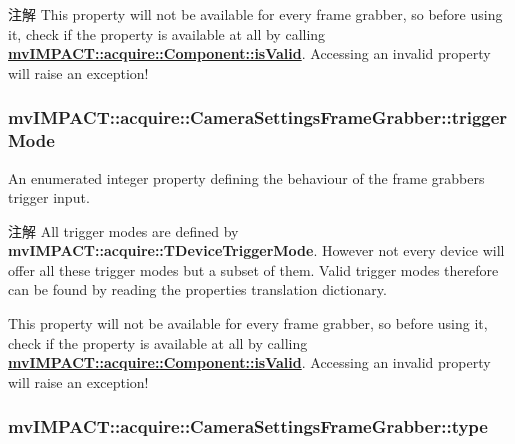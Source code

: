 \begin{DoxyNote}{注解}
This property will not be available for every frame grabber, so before using it, check if the property is available at all by calling {\bfseries \hyperlink{classmv_i_m_p_a_c_t_1_1acquire_1_1_component_ac51e55e7e046101f3c6119d84123abd5}{mv\+I\+M\+P\+A\+C\+T\+::acquire\+::\+Component\+::is\+Valid}}. Accessing an invalid property will raise an exception! 
\end{DoxyNote}
\hypertarget{classmv_i_m_p_a_c_t_1_1acquire_1_1_camera_settings_frame_grabber_a6bb960b80203a48a68ac20917ebd5e3f}{
\subsubsection[{trigger\+Mode}]{ mv\+I\+M\+P\+A\+C\+T\+::acquire\+::\+Camera\+Settings\+Frame\+Grabber\+::trigger\+Mode}}\label{classmv_i_m_p_a_c_t_1_1acquire_1_1_camera_settings_frame_grabber_a6bb960b80203a48a68ac20917ebd5e3f}


An enumerated integer property defining the behaviour of the frame grabbers trigger input. 

\begin{DoxyNote}{注解}
All trigger modes are defined by {\bfseries mv\+I\+M\+P\+A\+C\+T\+::acquire\+::\+T\+Device\+Trigger\+Mode}. However not every device will offer all these trigger modes but a subset of them. Valid trigger modes therefore can be found by reading the properties translation dictionary.

This property will not be available for every frame grabber, so before using it, check if the property is available at all by calling {\bfseries \hyperlink{classmv_i_m_p_a_c_t_1_1acquire_1_1_component_ac51e55e7e046101f3c6119d84123abd5}{mv\+I\+M\+P\+A\+C\+T\+::acquire\+::\+Component\+::is\+Valid}}. Accessing an invalid property will raise an exception! 
\end{DoxyNote}
\hypertarget{classmv_i_m_p_a_c_t_1_1acquire_1_1_camera_settings_frame_grabber_a3cf5c97b03127b143d79619658e2edb9}{
\subsubsection[{type}]{ mv\+I\+M\+P\+A\+C\+T\+::acquire\+::\+Camera\+Settings\+Frame\+Grabber\+::type}}\label{classmv_i_m_p_a_c_t_1_1acquire_1_1_camera_settings_frame_grabber_a3cf5c97b03127b143d79619658e2edb9}


